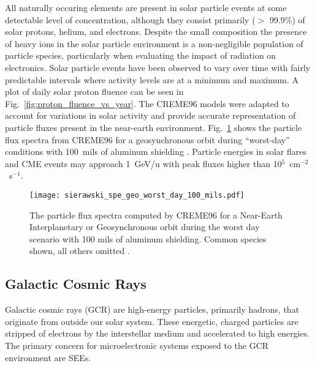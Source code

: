 All naturally occuring elements are present in solar particle events at some detectable level of concentration, although they consist primarily ($>$ 99.9\%) of solar protons, helium, and electrons.
Despite the small composition the presence of heavy ions in the solar particle environment is a non-negligible population of particle species, particularly when evaluating the impact of radiation on electronics.
Solar particle events have been observed to vary over time with fairly predictable intervals where activity levels are at a minimum and maximum.
A plot of daily solar proton fluence can be seen in Fig.~\ref{fig:proton_fluence_vs_year}.
The CREME96 models were adapted to account for variations in solar activity and provide accurate representation of particle fluxes present in the near-earth environment.
Fig.~\ref{fig:spe-geo-worst-day-100-mils} shows the particle flux spectra from CREME96 for a geosynchronous orbit during ``worst-day'' conditions with 100~mils of aluminum shielding \cite{tylka1997creme96}.
Particle energies in solar flares and CME events may approach 1~GeV/u with peak fluxes higher than 10$^5$~cm$^{-2}$~s$^{-1}$.
\begin{figure}[htbp]
    \begin{center}
        \texttt{[image: sierawski\_spe\_geo\_worst\_day\_100\_mils.pdf]}
    \end{center}
    \caption[The particle flux spectra computed by CREME96 for a Near-Earth Interplanetary or Geosynchronous orbit during the worst day scenario with 100 mils of aluminum shielding. Common species shown, all others omitted.]{The particle flux spectra computed by CREME96 for a Near-Earth Interplanetary or Geosynchronous orbit during the worst day scenario with 100 mils of aluminum shielding. Common species shown, all others omitted \cite{Sierawski:2011tc}.}
    \label{fig:spe-geo-worst-day-100-mils}
\end{figure}

\subsection{Galactic Cosmic Rays} %
\label{sub:galactic_cosmic_rays}
Galactic cosmic rays (GCR) are high-energy particles, primarily hadrons, that originate from outside our solar system.
These energetic, charged particles are stripped of electrons by the interstellar medium and accelerated to high energies.
The primary concern for microelectronic systems exposed to the GCR environment are SEEs.

